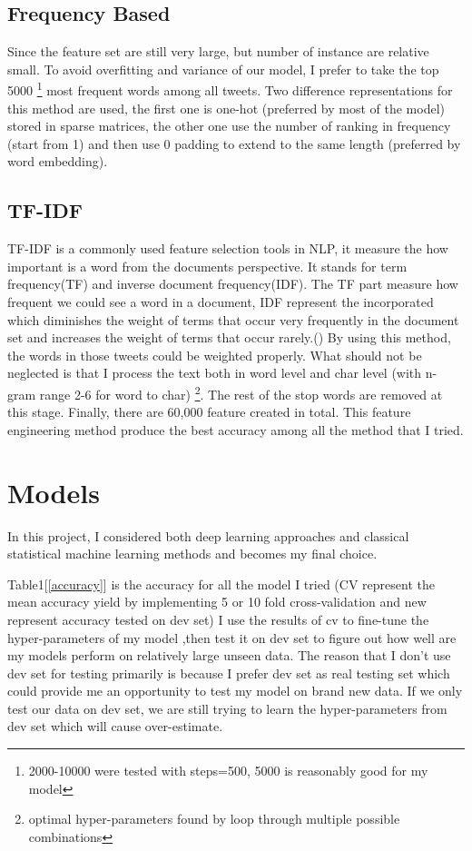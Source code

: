 \documentclass[11pt]{article}
\begin{document}
\subsection{Frequency Based}
Since the feature set are still very large, but number of instance
are relative small. To avoid overfitting and variance of our model, 
I prefer to take the top 5000
\footnote{2000-10000 were tested with steps=500, 5000 is reasonably good
for my model}
most frequent words among all tweets. 
Two difference representations for this method are
used, the first one is one-hot (preferred by most of the model) stored in 
sparse matrices, the other one use the number of ranking in frequency 
(start from 1) and then use 
0 padding to extend to the same length (preferred by word embedding).

\subsection{TF-IDF}
TF-IDF is a commonly used feature selection tools in NLP, it measure
the how important is a word from the documents perspective. It stands for
term frequency(TF) and inverse document frequency(IDF).
The TF part measure how frequent we could see a word in a document, 
IDF represent the incorporated which diminishes the weight of terms that 
occur very frequently in the document set and increases the 
weight of terms that occur rarely.()
By using this method, the words in those tweets could be weighted
properly. What should not be neglected is that I process the text both
in word level and char level (with n-gram range 2-6 for word to char)
\footnote{optimal hyper-parameters found by loop through multiple
possible combinations}. The rest of the stop words are removed at this
stage. Finally, there are 60,000 feature created in total. This feature 
engineering method produce the best accuracy among all the method that
I tried.

\section{Models}
\label{models}
In this project, I considered both deep learning approaches and 
classical statistical machine learning methods and becomes my final
choice.

Table1[\ref{accuracy}] is
the accuracy for all the model I tried (CV represent the mean accuracy
yield by implementing 5 or 10 fold cross-validation and new represent 
accuracy tested on dev set)
I use the results of cv to fine-tune the hyper-parameters of my model 
,then test it on dev set to figure out how well are my models perform
on relatively large unseen data. The reason that I don't use dev set for
testing primarily is because I prefer dev set as real testing set which 
could provide me an opportunity to test my model on brand new data. If 
we only test our data on dev set, we are still trying to learn the
hyper-parameters from dev set which will cause over-estimate.
\end{document}
